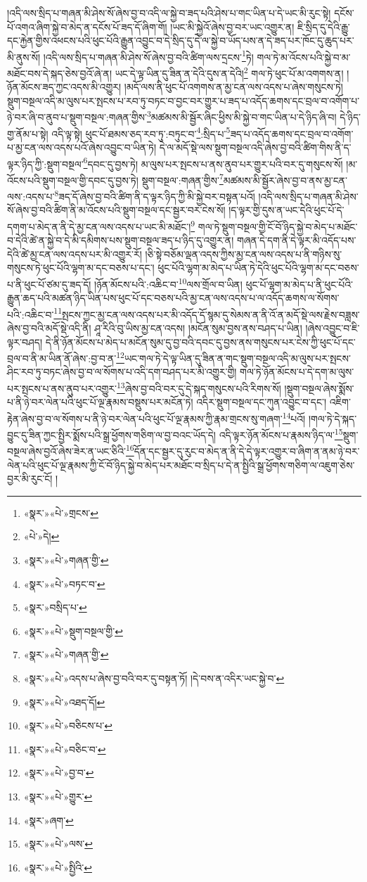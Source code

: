 །འདི་ལས་སྲིད་པ་གཞན་མི་ཤེས་སོ་ཞེས་བྱ་བ་འདི་ལ་སྐྱེ་བ་ཟད་པའི་ཤེས་པ་གང་ཡིན་པ་དེ་ཡང་མི་རུང་སྟེ། དངོས་པོ་འགའ་ཞིག་སྐྱེ་བ་མེད་ན་དངོས་པོ་ཟད་དོ་ཞིག་གོ། །ཡང་མི་སྐྱེའོ་ཞེས་བྱ་བར་ཡང་འགྱུར་ན། ཇི་སྲིད་དུ་དེའི་རྒྱུ་དང་རྐྱེན་གྱིས་འཕངས་པའི་ཕུང་པོའི་རྒྱུན་འབྱུང་བ་དེ་སྲིད་དུ་དེ་ལ་སྐྱེ་བ་ཡོད་པས་ན་དེ་ཟད་པར་ཁོང་དུ་ཆུད་པར་མི་ནུས་སོ། །འདི་ལས་སྲིད་པ་གཞན་མི་ཤེས་སོ་ཞེས་བྱ་བའི་ཚིག་ལས་དྲངས་\footnote{«སྣར་»«པེ་»གྲངས་}ཏེ། གལ་ཏེ་མ་འོངས་པའི་སྐྱེ་བ་མ་མཐོང་བས་དེ་སྐད་ཅེས་བྱའོ་ཞེ་ན། ཡང་དེ་ལྟ་ཡིན་དུ་ཟིན་ན་དེའི་དུས་ན་དེའི།\footnote{«པེ་»དེ།} གལ་ཏེ་ཕུང་པོ་མ་འགགས་ན། །ཉོན་མོངས་ཟད་ཀྱང་འདས་མི་འགྱུར། །མདོ་ལས་ནི་ཕུང་པོ་འགགས་ན་མྱ་ངན་ལས་འདས་པ་ཞེས་གསུངས་ཏེ། སྡུག་བསྔལ་འདི་མ་ལུས་པར་སྤངས་པ་རབ་ཏུ་བཏང་བ་བྱང་བར་གྱུར་པ་ཟད་པ་འདོད་ཆགས་དང་བྲལ་བ་འགོག་པ་ཉེ་བར་ཞི་བ་ནུབ་པ་སྡུག་བསྔལ་:གཞན་གྱིས་\footnote{«སྣར་»«པེ་»གཞན་གྱི་}མཚམས་མི་སྦྱོར་ཞིང་ཕྱིས་མི་སྐྱེ་བ་གང་ཡིན་པ་དེ་ཉིད་ཞི་བ། དེ་ཉིད་གྱ་ནོམ་པ་སྟེ། འདི་ལྟ་སྟེ། ཕུང་པོ་ཐམས་ཅད་རབ་ཏུ་:བཏུང་བ་\footnote{«སྣར་»«པེ་»བཏང་བ་}:སྲིད་པ་\footnote{«སྣར་»བསྲིད་པ་}ཟད་པ་འདོད་ཆགས་དང་བྲལ་བ་འགོག་པ་མྱ་ངན་ལས་འདས་པའོ་ཞེས་འབྱུང་བ་ཡིན་ཏེ། དེ་ལ་མདོ་སྡེ་ལས་སྡུག་བསྔལ་འདི་ཞེས་བྱ་བའི་ཚིག་གིས་ནི་ད་ལྟར་ཉིད་ཀྱི་:སྡུག་བསྔལ་\footnote{«སྣར་»«པེ་»སྡུག་བསྔལ་གྱི་}དབང་དུ་བྱས་ཏེ། མ་ལུས་པར་སྤངས་པ་ནས་ནུབ་པར་གྱུར་པའི་བར་དུ་གསུངས་སོ། །མ་འོངས་པའི་སྡུག་བསྔལ་གྱི་དབང་དུ་བྱས་ཏེ། སྡུག་བསྔལ་:གཞན་གྱིས་\footnote{«སྣར་»«པེ་»གཞན་གྱི་}མཚམས་མི་སྦྱོར་ཞེས་བྱ་བ་ནས་མྱ་ངན་ལས་:འདས་པ་\footnote{«སྣར་»«པེ་»འདས་པ་ཞེས་བྱ་བའི་བར་དུ་བསྟན་ཏོ། །དེ་བས་ན་འདིར་ཡང་སྐྱེ་བ་}ཟད་དོ་ཞེས་བྱ་བའི་ཚིག་ནི་ད་ལྟར་ཉིད་ཀྱི་མི་སྐྱེ་བར་བསྟན་པའོ། །འདི་ལས་སྲིད་པ་གཞན་མི་ཤེས་སོ་ཞེས་བྱ་བའི་ཚིག་ནི་མ་འོངས་པའི་སྡུག་བསྔལ་དང་སྦྱར་བར་ངེས་སོ། །ད་ལྟར་གྱི་དུས་ན་ཡང་དེའི་ཕུང་པོ་དེ་དགག་པ་མེད་ན་ནི་དེ་མྱ་ངན་ལས་འདས་པ་ཡང་མི་མཐོང་།\footnote{«སྣར་»«པེ་»འཐད་དོ།} གལ་ཏེ་སྡུག་བསྔལ་གྱི་ངོ་བོ་ཉིད་སྐྱེ་བ་མེད་པ་མཐོང་བ་དེའི་ཚེ་ན་སྐྱེ་བ་དེ་མི་དམིགས་པས་སྡུག་བསྔལ་ཟད་པ་ཉིད་དུ་འགྱུར་ན། གཞན་དེ་དག་ནི་དེ་ལྟར་མི་འདོད་པས་དེའི་ཚེ་མྱ་ངན་ལས་འདས་པར་མི་འགྱུར་རོ། །ཅི་སྟེ་བཅོམ་ལྡན་འདས་ཀྱིས་མྱ་ངན་ལས་འདས་པ་ནི་གཉིས་སུ་གསུངས་ཏེ་ཕུང་པོའི་ལྷག་མ་དང་བཅས་པ་དང་། ཕུང་པོའི་ལྷག་མ་མེད་པ་ཡིན་ཏེ་དེའི་ཕུང་པོའི་ལྷག་མ་དང་བཅས་པ་ནི་ཕུང་པོ་ཙམ་དུ་ཟད་དོ། །ཉོན་མོངས་པའི་:འཆིང་བ་\footnote{«སྣར་»«པེ་»བཅིངས་པ་}ལས་གྲོལ་བ་ཡིན། ཕུང་པོ་ལྷག་མ་མེད་པ་ནི་ཕུང་པོའི་རྒྱུན་ཆད་པའི་མཚན་ཉིད་ཡིན་པས་ཕུང་པོ་དང་བཅས་པའི་མྱ་ངན་ལས་འདས་པ་ལ་འདོད་ཆགས་ལ་སོགས་པའི་:འཆིང་བ་\footnote{«སྣར་»«པེ་»བཅིང་བ་}སྤངས་ཀྱང་མྱ་ངན་ལས་འདས་པར་མི་འདོད་དོ་སྙམ་དུ་སེམས་ན་ནི་འོ་ན་མདོ་སྡེ་ལས་རྗེས་བཟླས་ཞེས་བྱ་བའི་མདོ་སྡེ་འདི་ནི། ཤཱ་རིའི་བུ་ཡིས་མྱ་ངན་འདས། །མངོན་སུམ་བྱས་ནས་བཤད་པ་ཡིན། །ཞེས་འབྱུང་བ་ཇི་ལྟར་བཤད། དེ་ནི་ཉོན་མོངས་པ་མེད་པ་མངོན་སུམ་དུ་བྱ་བའི་དབང་དུ་བྱས་ནས་གསུངས་པར་ངེས་ཀྱི་ཕུང་པོ་དང་བྲལ་བ་ནི་མ་ཡིན་ནོ་ཞེས་:བྱ་བ་ན་\footnote{«སྣར་»«པེ་»བྱ་བ་}ཡང་གལ་ཏེ་དེ་ལྟ་ཡིན་དུ་ཟིན་ན་གང་སྡུག་བསྔལ་འདི་མ་ལུས་པར་སྤངས་ཤིང་རབ་ཏུ་བཏང་ཞེས་བྱ་བ་ལ་སོགས་པ་འདི་དག་བཤད་པར་མི་འགྱུར་གྱི། གལ་ཏེ་ཉོན་མོངས་པ་དེ་དག་མ་ལུས་པར་སྤངས་པ་ནས་ནུབ་པར་འགྱུར་\footnote{«སྣར་»«པེ་»གྱུར་}ཞེས་བྱ་བའི་བར་དུ་དེ་སྐད་གསུངས་པའི་རིགས་སོ། །སྡུག་བསྔལ་ཞེས་སྨོས་པ་ནི་ཉེ་བར་ལེན་པའི་ཕུང་པོ་ལྔ་རྣམས་བསྡུས་པར་མངོན་ཏེ། འདིར་སྡུག་བསྔལ་དང་ཀུན་འབྱུང་བ་དང་། འཇིག་རྟེན་ཞེས་བྱ་བ་ལ་སོགས་པ་ནི་ཉེ་བར་ལེན་པའི་ཕུང་པོ་ལྔ་རྣམས་ཀྱི་རྣམ་གྲངས་སུ་གཞག་\footnote{«སྣར་»ཞག་}པའོ། །གལ་ཏེ་དེ་སྐད་བྱུང་དུ་ཟིན་ཀྱང་སྤྱིར་སྨོས་པའི་སྒྲ་ཕྱོགས་གཅིག་ལ་བྱ་བའང་ཡོད་དེ། འདི་ལྟར་ཉོན་མོངས་པ་རྣམས་ཉིད་ལ་\footnote{«སྣར་»«པེ་»ལས་}སྡུག་བསྔལ་ཞེས་བྱའོ་ཞེས་ཟེར་ན་ཡང་ཅིའི་\footnote{«སྣར་»«པེ་»སྤྱིའི་}དོན་དང་སྦྱར་དུ་རུང་བ་མེད་ན་ནི་དེ་དེ་ལྟར་འགྱུར་བ་ཞིག་ན་ནམ་ཉེ་བར་ལེན་པའི་ཕུང་པོ་ལྔ་རྣམས་ཀྱི་ངོ་བོ་ཉིད་སྐྱེ་བ་མེད་པར་མཐོང་བ་སྲིད་པ་དེ་ན་སྤྱིའི་སྒྲ་ཕྱོགས་གཅིག་ལ་འཇུག་ཅེས་བྱར་མི་རུང་ངོ། །
